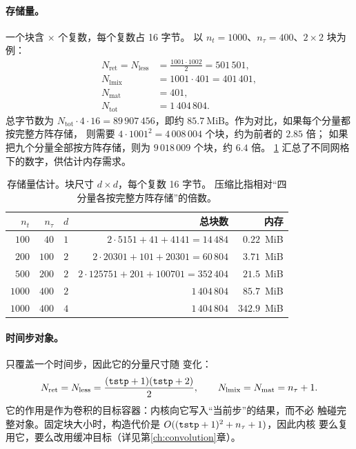\paragraph{存储量。}
一个块含 $\times$ 个复数，每个复数占 16 字节。
以 $n_t=1000$、$n_\tau=400$、$2\times2$ 块为例：
\begin{align}
    N_{\mathrm{ret}} = N_{\mathrm{less}} &= \frac{1001\cdot1002}{2}
        = 501\,501, \\
    N_{\mathrm{lmix}} &= 1001\cdot401 = 401\,401,\\
    N_{\mathrm{mat}} &= 401,\\
    N_{\mathrm{tot}} &= 1\,404\,804 .
\end{align}
总字节数为 $N_{\mathrm{tot}}\cdot4\cdot16 = 89\,907\,456$，即约
$85.7~\mathrm{MiB}$。作为对比，如果每个分量都按完整方阵存储，
则需要 $4\cdot1001^2=4\,008\,004$ 个块，约为前者的 $2.85$ 倍；
如果把九个分量全部按方阵存储，则为 $9\,018\,009$ 个块，约 $6.4$ 倍。
\cref{tab:memory} 汇总了不同网格下的数字，供估计内存需求。

\begin{table}[htbp]
    \centering
    \caption[存储量估计]{存储量估计。块尺寸 $d\times d$，每个复数 16 字节。
             压缩比指相对“四分量各按完整方阵存储”的倍数。}
    \label{tab:memory}
    \small
    \begin{tabular}{@{}rrrrr@{}}
        \toprule
        $n_t$ & $n_\tau$ & $d$ & 总块数 & 内存 \\ 
        \midrule
        $100$  & $40$  & $1$ & $2\cdot5151 + 41 + 4141 = 14\,484$ & $0.22$~MiB \\
        $200$  & $100$ & $2$ & $2\cdot20301 + 101 + 20301 = 60\,804$ & $3.71$~MiB \\
        $500$  & $200$ & $2$ & $2\cdot125751 + 201 + 100701 = 352\,404$ & $21.5$~MiB \\
        $1000$ & $400$ & $2$ & $1\,404\,804$ & $85.7$~MiB \\
        $1000$ & $400$ & $4$ & $1\,404\,804$ & $342.9$~MiB \\
        \bottomrule
    \end{tabular}
\end{table}

\paragraph{时间步对象。}
 只覆盖一个时间步，因此它的分量尺寸随 
变化：
\begin{equation}
    N_{\mathrm{ret}} = N_{\mathrm{less}} = \frac{(\texttt{tstp}+1)(\texttt{tstp}+2)}{2},
    \qquad
    N_{\mathrm{lmix}} = N_{\mathrm{mat}} = n_\tau+1 .
    \label{eq:step-blocks}
\end{equation}
它的作用是作为卷积的目标容器：内核向它写入“当前步”的结果，而不必
触碰完整对象。固定块大小时，构造代价是 $O((\texttt{tstp}+1)^2+n_\tau+1)$，因此内核
要么复用它，要么改用缓冲目标（详见第\ref{ch:convolution}章）。

